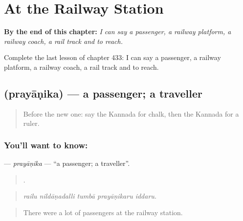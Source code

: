 
\chapter{At the Railway Station}
\label{ch:ka-at-the-railway-station}

\begin{chapteropening}
\textbf{By the end of this chapter:} \emph{I can say a passenger, a railway platform, a railway coach, a rail track and to reach.}

Complete the last lesson of chapter 433: I can say a passenger, a railway platform, a railway coach, a rail track and to reach.
\end{chapteropening}

\section[\texorpdfstring{\kn{ಪ್ರಯಾಣಿಕ} (prayāṇika)}{ಪ್ರಯಾಣಿಕ (prayāṇika)}]{ (prayāṇika) — a passenger; a traveller}

\label{lesson:KA-C433-prayanika}



\begin{quote}
Before the new one: say the Kannada for chalk, then the Kannada for a ruler.
\end{quote}

\subsection*{You'll want to know: }
\textbf{} — \emph{prayāṇika} — \textquotedblleft{}a passenger; a traveller\textquotedblright{}.

\begin{quote}
    .
\end{quote}

\begin{quote}
\emph{railu nildāṇadalli tumbā prayāṇikaru iddaru.}
\end{quote}

\begin{quote}
There were a lot of passengers at the railway station.
\end{quote}

